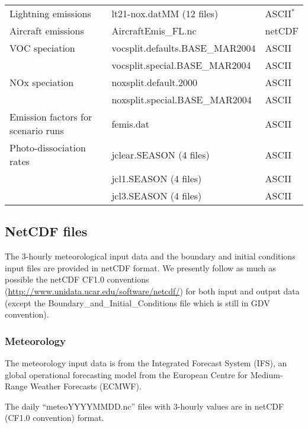\begin{table}
\begin{small}
\begin{tabular}{lll}
Lightning emissions & lt21-nox.datMM  \quad (12 files) & ASCII$^*$\\
Aircraft emissions & AircraftEmis\_FL.nc & netCDF \\
VOC speciation & vocsplit.defaults.BASE\_MAR2004 & ASCII\\
 & vocsplit.special.BASE\_MAR2004  & ASCII\\
NOx speciation & noxsplit.default.2000 & ASCII\\
 &noxsplit.special.BASE\_MAR2004& ASCII\\  
Emission factors for scenario runs & femis.dat & ASCII\\
Photo-dissociation rates & jclear.SEASON \quad (4 files) & ASCII\\
 & jcl1.SEASON \quad (4 files) & ASCII\\
 & jcl3.SEASON \quad (4 files) & ASCII\\
\hline
\end{tabular}
\end{small}


\end{table}

\subsection{NetCDF files}


The 3-hourly meteorological input data and the boundary and initial 
conditions input files are provided in netCDF format. 
We presently follow as much as possible the netCDF CF1.0 conventions 
(\url{http://www.unidata.ucar.edu/software/netcdf/}) for both input
and output data (except the Boundary\_and\_Initial\_Conditions file which
is still in GDV convention).

\subsubsection{Meteorology}

The meteorology input data is from the Integrated Forecast System (IFS), an global operational 
forecasting model from the European Centre for Medium-Range Weather Forecasts (ECMWF). 

The daily ``meteoYYYYMMDD.nc'' files with 3-hourly values are in netCDF 
(CF1.0 convention) format.

